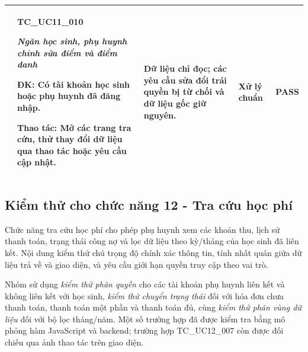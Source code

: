 \begin{longtable}{|>{\centering\arraybackslash}p{0.8cm}|>{\raggedright\arraybackslash}p{4.6cm}|>{\raggedright\arraybackslash}p{3.8cm}|>{\raggedright\arraybackslash}p{3.8cm}|>{\centering\arraybackslash}p{1.5cm}|}
10 & \textbf{TC\_UC11\_010}\par \textit{Ngăn học sinh, phụ huynh chỉnh sửa điểm và điểm danh}\par \textbf{ĐK:} Có tài khoản học sinh hoặc phụ huynh đã đăng nhập.\par \textbf{Thao tác:} Mở các trang tra cứu, thử thay đổi dữ liệu qua thao tác hoặc yêu cầu cập nhật. & Dữ liệu chỉ đọc; các yêu cầu sửa đổi trái quyền bị từ chối và dữ liệu gốc giữ nguyên. & Xử lý chuẩn & \textbf{PASS} \\ \hline
\end{longtable}

\subsection{Kiểm thử cho chức năng 12 - Tra cứu học phí}
\label{subsec:test-uc12}

\hspace*{1em}Chức năng tra cứu học phí cho phép phụ huynh xem các khoản thu, lịch sử thanh toán, trạng thái công nợ và lọc dữ liệu theo kỳ/tháng của học sinh đã liên kết. Nội dung kiểm thử chú trọng độ chính xác thông tin, tính nhất quán giữa dữ liệu trả về và giao diện, và yêu cầu giới hạn quyền truy cập theo vai trò.

Nhóm sử dụng \textit{kiểm thử phân quyền} cho các tài khoản phụ huynh liên kết và không liên kết với học sinh, \textit{kiểm thử chuyển trạng thái} đối với hóa đơn chưa thanh toán, thanh toán một phần và thanh toán đủ, cùng \textit{kiểm thử phân vùng dữ liệu} đối với bộ lọc tháng/năm. Một số trường hợp đã được kiểm tra bằng mô phỏng hàm JavaScript và backend; trường hợp TC\_UC12\_007 còn được đối chiếu qua ảnh thao tác trên giao diện.

